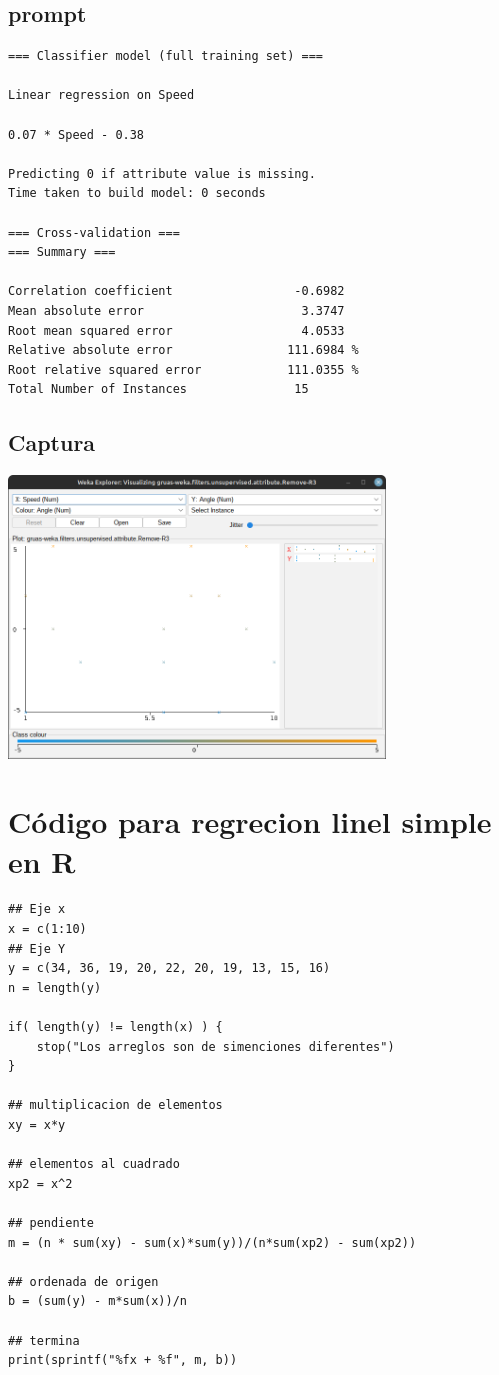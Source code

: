\documentclass[12pt]{article}
\begin{document}
\subsection*{prompt}
\label{sec:org003faa5}
\begin{verbatim}
=== Classifier model (full training set) ===

Linear regression on Speed

0.07 * Speed - 0.38

Predicting 0 if attribute value is missing.
Time taken to build model: 0 seconds

=== Cross-validation ===
=== Summary ===

Correlation coefficient                 -0.6982
Mean absolute error                      3.3747
Root mean squared error                  4.0533
Relative absolute error                111.6984 %
Root relative squared error            111.0355 %
Total Number of Instances               15     
\end{verbatim}

\subsection*{Captura}
\label{sec:org5d5a067}
\begin{center}
\includegraphics[width=10cm]{img/3.png}
\end{center}

\section*{Código para regrecion linel simple en R}
\label{sec:orgb59d6b9}
\begin{verbatim}
## Eje x
x = c(1:10)
## Eje Y
y = c(34, 36, 19, 20, 22, 20, 19, 13, 15, 16)
n = length(y)

if( length(y) != length(x) ) {
    stop("Los arreglos son de simenciones diferentes")
}

## multiplicacion de elementos
xy = x*y

## elementos al cuadrado
xp2 = x^2

## pendiente 
m = (n * sum(xy) - sum(x)*sum(y))/(n*sum(xp2) - sum(xp2))

## ordenada de origen
b = (sum(y) - m*sum(x))/n

## termina
print(sprintf("%fx + %f", m, b))
\end{verbatim}
\end{document}
